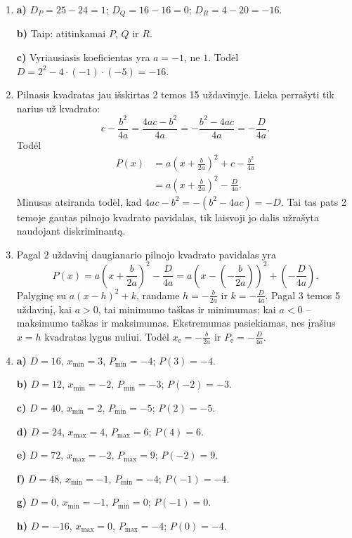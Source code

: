 \documentclass[12pt,a4paper]{article}
\begin{document}
\begin{enumerate}
\item \textbf{a)} $D_P=25-24=1$; $D_Q=16-16=0$; $D_R=4-20=-16$.

\textbf{b)} Taip: atitinkamai $P$, $Q$ ir $R$.

\textbf{c)} Vyriausiasis koeficientas yra $a=-1$, ne $1$. Todėl $D=2^2-4\cdot(-1)\cdot(-5)=-16$.
\item Pilnasis kvadratas jau išskirtas 2 temos 15 uždavinyje. Lieka perrašyti tik narius už kvadrato:
\[
c-\frac{b^2}{4a}=\frac{4ac-b^2}{4a}
=-\frac{b^2-4ac}{4a}=-\frac{D}{4a}.
\]
Todėl
\[
\begin{aligned}
P(x)&=a\left(x+\frac{b}{2a}\right)^2+c-\frac{b^2}{4a}\\
&=a\left(x+\frac{b}{2a}\right)^2-\frac{D}{4a}.
\end{aligned}
\]
Minusas atsiranda todėl, kad $4ac-b^2=-(b^2-4ac)=-D$. Tai tas pats 2 temoje gautas pilnojo kvadrato pavidalas, tik laisvoji jo dalis užrašyta naudojant diskriminantą.
\item Pagal 2 uždavinį daugianario pilnojo kvadrato pavidalas yra
\[
P(x)=a\left(x+\frac{b}{2a}\right)^2-\frac{D}{4a}
=a\left(x-\left(-\frac{b}{2a}\right)\right)^2+\left(-\frac{D}{4a}\right).
\]
Palyginę su $a(x-h)^2+k$, randame $h=-\frac{b}{2a}$ ir $k=-\frac{D}{4a}$. Pagal 3 temos 5 uždavinį, kai $a>0$, tai minimumo taškas ir minimumas; kai $a<0$ – maksimumo taškas ir maksimumas. Ekstremumas pasiekiamas, nes įrašius $x=h$ kvadratas lygus nuliui. Todėl $x_{\mathrm e}=-\frac{b}{2a}$ ir $P_{\mathrm e}=-\frac{D}{4a}$.
\item \textbf{a)} $D=16$, $x_{\min}=3$, $P_{\min}=-4$; $P(3)=-4$.

\textbf{b)} $D=12$, $x_{\min}=-2$, $P_{\min}=-3$; $P(-2)=-3$.

\textbf{c)} $D=40$, $x_{\min}=2$, $P_{\min}=-5$; $P(2)=-5$.

\textbf{d)} $D=24$, $x_{\max}=4$, $P_{\max}=6$; $P(4)=6$.

\textbf{e)} $D=72$, $x_{\max}=-2$, $P_{\max}=9$; $P(-2)=9$.

\textbf{f)} $D=48$, $x_{\min}=-1$, $P_{\min}=-4$; $P(-1)=-4$.

\textbf{g)} $D=0$, $x_{\min}=-1$, $P_{\min}=0$; $P(-1)=0$.

\textbf{h)} $D=-16$, $x_{\max}=0$, $P_{\max}=-4$; $P(0)=-4$.


\end{enumerate}
\end{document}
